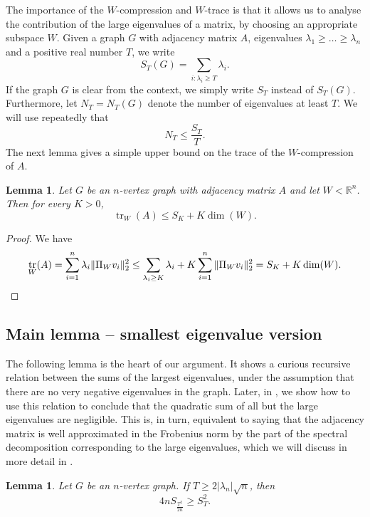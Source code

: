 \documentclass[11pt]{article}
\theoremstyle{plain}
\newtheorem{lemma}[theorem]{Lemma}
\theoremstyle{definition}
\DeclareMathOperator{\trace}{tr}
\begin{document}
\bigskip

The importance of the $W$-compression and $W$-trace is that it allows us to analyse the contribution of the large eigenvalues of a matrix, by choosing an appropriate subspace $W$. Given a graph $G$ with adjacency matrix $A$, eigenvalues $\lambda_1\geq \dots\geq \lambda_n$ and a positive real number $T$, we write 
$$S_T(G)=\sum_{i: \lambda_i\geq T}\lambda_i.$$
If the graph $G$ is clear from the context, we simply write $S_T$ instead of $S_T(G)$. Furthermore, let $N_T=N_T(G)$ denote the number of eigenvalues at least $T$. We will use repeatedly  that 
$$N_T\leq \frac{S_T}{T}.$$
The next lemma gives a simple upper bound on the trace of the $W$-compression of $A$.

\begin{lemma}\label{lemma:trace_compression}
Let $G$ be an $n$-vertex graph with adjacency matrix $A$ and let $W<\mathbb{R}^n$. Then for every $K>0$,
$$\trace_W(A)\leq S_K+K\dim(W).$$
\end{lemma}
\begin{proof}
We have
\[\trace_W(A)=\sum_{i=1}^n \lambda_i \|\Pi_W v_i\|_2^2\leq \sum_{\lambda_i\geq K}\lambda_i+K\sum_{i=1}^n \|\Pi_W v_i\|_2^2=S_K+K\dim(W).\hfill\qedhere\]
\end{proof}

\subsection{Main lemma -- smallest eigenvalue version}\label{sect:main_se}

The following lemma is the heart of our argument. It shows a curious recursive relation between the sums of the largest eigenvalues, under the assumption that there are no very negative eigenvalues in the graph. Later, in , we show how to use this relation to conclude that the quadratic sum of all but the large eigenvalues are negligible. This is, in turn, equivalent to saying that the adjacency matrix is well approximated in the Frobenius norm by the part of the spectral decomposition corresponding to the large eigenvalues, which we will discuss in more detail in .

\begin{lemma}\label{lemma:main_smallest_eigenalue}
Let $G$ be an $n$-vertex graph. If $T\geq 2|\lambda_n|\sqrt{n}$, then
\begin{equation}\label{eqn:S_T bound}
    4nS_{\frac{T^2}{2n}}\geq S_T^2.
\end{equation}
\end{lemma}
\end{document}
